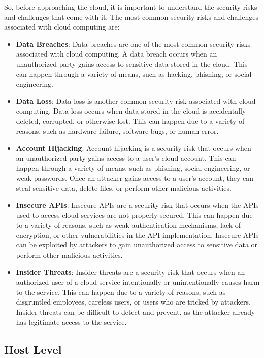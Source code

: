 So, before approaching the cloud, it is important to understand the security risks and challenges that come with it. The most common security risks and challenges associated with cloud computing are:
\begin{itemize}
    \item \textbf{Data Breaches}: Data breaches are one of the most common security risks associated with cloud computing. A data breach occurs when an unauthorized party gains access to sensitive data stored in the cloud. This can happen through a variety of means, such as hacking, phishing, or social engineering.
    \item \textbf{Data Loss}: Data loss is another common security risk associated with cloud computing. Data loss occurs when data stored in the cloud is accidentally deleted, corrupted, or otherwise lost. This can happen due to a variety of reasons, such as hardware failure, software bugs, or human error.
    \item \textbf{Account Hijacking}: Account hijacking is a security risk that occurs when an unauthorized party gains access to a user's cloud account. This can happen through a variety of means, such as phishing, social engineering, or weak passwords. Once an attacker gains access to a user's account, they can steal sensitive data, delete files, or perform other malicious activities.
    \item \textbf{Insecure APIs}: Insecure APIs are a security risk that occurs when the APIs used to access cloud services are not properly secured. This can happen due to a variety of reasons, such as weak authentication mechanisms, lack of encryption, or other vulnerabilities in the API implementation. Insecure APIs can be exploited by attackers to gain unauthorized access to sensitive data or perform other malicious activities.
    \item \textbf{Insider Threats}: Insider threats are a security risk that occurs when an authorized user of a cloud service intentionally or unintentionally causes harm to the service. This can happen due to a variety of reasons, such as disgruntled employees, careless users, or users who are tricked by attackers. Insider threats can be difficult to detect and prevent, as the attacker already has legitimate access to the service.
\end{itemize}

\subsection*{Host Level}


